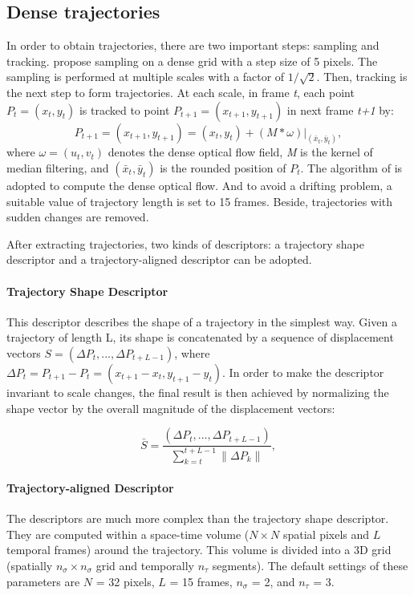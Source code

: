 \documentclass[review]{elsarticle}
\begin{document}
\subsection{Dense trajectories}
In order to obtain trajectories, there are two important steps: sampling and tracking. \cite{wang2011densetraj} propose sampling on a dense grid with a step size of 5 pixels. The sampling is performed at multiple scales with a factor of $1/\sqrt{2}$. Then, tracking is the next step to form trajectories. At each scale, in frame \textit{t}, each point \textit{$P_t = (x_t, y_t)$} is tracked to point \textit{$P_{t+1} = (x_{t+1}, y_{t+1})$} in next frame \textit{t+1} by:
\begin{equation}
	\textit{$P_{t+1} = (x_{t+1}, y_{t+1}) = (x_t, y_t) + (M*\omega)|_{(\bar{x}_t,\bar{y}_t)} $},
\end{equation}
where \textit{$\omega = (u_t, v_t)$} denotes the dense optical flow field, \textit{M} is the kernel of median filtering, and \textit{$(\bar{x}_t,\bar{y}_t)$} is the rounded position of \textit{$P_t$}. The algorithm of \cite{farneback2003two} is adopted to compute the dense optical flow. And to avoid a drifting problem, a suitable value of trajectory length is set to 15 frames. Beside, trajectories with sudden changes are removed.

After extracting trajectories, two kinds of descriptors: a trajectory shape descriptor and a trajectory-aligned descriptor can be adopted.

\paragraph{Trajectory Shape Descriptor}This descriptor describes the shape of a trajectory in the simplest way. Given a trajectory of length L, its shape is concatenated by a sequence of displacement vectors \textit{$S = (\Delta P_t, ..., \Delta P_{t+L-1})$}, where \textit{$\Delta P_t = P_{t+1} - P_t = (x_{t+1} - x_t, y_{t+1} - y_t)$}. In order to make the descriptor invariant to scale changes, the final result is then achieved by normalizing the shape vector by the overall magnitude of the displacement vectors:

\begin{equation}
	\textit{$\bar{S} = \frac{(\Delta P_t, ..., \Delta P_{t+L-1})}{\sum_{k=t}^{t+L-1}\|\Delta P_k\|}$},
\end{equation}

\paragraph{Trajectory-aligned Descriptor}The descriptors are much more complex than the trajectory shape descriptor. They are computed within a space-time volume ($N \times N$ spatial pixels and $L$ temporal frames) around the trajectory. This volume is divided into a 3D grid (spatially $n_\sigma \times n_\sigma$ grid and temporally $n_\tau$ segments). The default settings of these parameters are $N$ = 32 pixels, $L$ = 15 frames, $n_\sigma$ = 2, and $n_\tau$ = 3.
\end{document}
